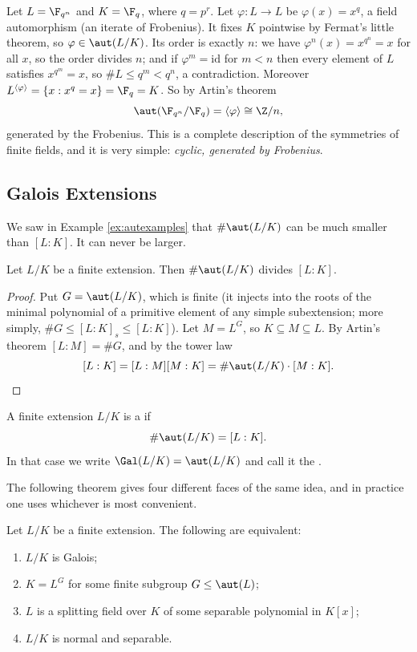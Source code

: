 \begin{example}\label{ex:frobgen}
	Let $L = \F_{q^n}$ and $K = \F_q$, where $q = p^r$. Let $\varphi : L \to L$ be $\varphi(x) = x^q$, a field automorphism (an iterate of Frobenius). It fixes $K$ pointwise by Fermat's little theorem, so $\varphi \in \aut(L/K)$. Its order is exactly $n$: we have $\varphi^n(x) = x^{q^n} = x$ for all $x$, so the order divides $n$; and if $\varphi^m = \mathrm{id}$ for $m<n$ then every element of $L$ satisfies $x^{q^m} = x$, so $\#L \leq q^m < q^n$, a contradiction. Moreover $L^{\langle\varphi\rangle} = \{x : x^q = x\} = \F_q = K$. So by Artin's theorem
	$$\aut(\F_{q^n}/\F_q) = \langle \varphi \rangle \cong \Z/n,$$
	generated by the Frobenius. This is a complete description of the symmetries of finite fields, and it is very simple: \emph{cyclic, generated by Frobenius}.
\end{example}

\subsection{Galois Extensions}

We saw in Example \ref{ex:autexamples} that $\#\aut(L/K)$ can be much smaller than $[L:K]$. It can never be larger.

\begin{proposition}\label{prop:autdivides}
	Let $L/K$ be a finite extension. Then $\#\aut(L/K)$ divides $[L:K]$.
\end{proposition}

\begin{proof}
	Put $G = \aut(L/K)$, which is finite (it injects into the roots of the minimal polynomial of a primitive element of any simple subextension; more simply, $\#G \leq [L:K]_s \leq [L:K]$). Let $M = L^G$, so $K \subseteq M \subseteq L$. By Artin's theorem $[L:M] = \#G$, and by the tower law
	$$[L:K] = [L:M][M:K] = \#\aut(L/K)\cdot[M:K]. \qedhere$$
\end{proof}

\begin{definition}
	A finite extension $L/K$ is a  if
	$$\#\aut(L/K) = [L:K].$$
	In that case we write $\Gal(L/K) = \aut(L/K)$ and call it the .
\end{definition}

The following theorem gives four different faces of the same idea, and in practice one uses whichever is most convenient.

\begin{theorem}\label{thm:galoistfae}
	Let $L/K$ be a finite extension. The following are equivalent:
	\begin{enumerate}[label=(\roman*)]
		\item $L/K$ is Galois;
		\item $K = L^G$ for some finite subgroup $G \leq \aut(L)$;
		\item $L$ is a splitting field over $K$ of some separable polynomial in $K[x]$;
		\item $L/K$ is normal and separable.
	\end{enumerate}
\end{theorem}

